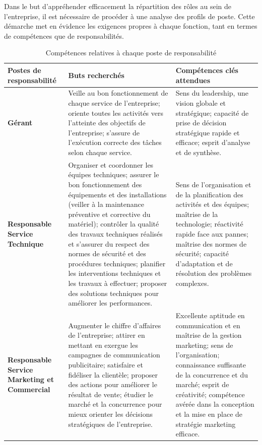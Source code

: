 Dans le but d'appréhender efficacement la répartition des rôles au sein de l'entreprise, il est nécessaire de procéder à une analyse des profils de poste. Cette démarche met en évidence les exigences propres à chaque fonction, tant en termes de compétences que de responsabilités.


\begin{table}[htbp]
    \centering
    \caption{Compétences relatives à chaque poste de responsabilité}
    \label{tab:competences}
    \renewcommand{\arraystretch}{1.5}
    \begin{tabularx}{\textwidth}{|>{\raggedright\arraybackslash}p{3cm}|X|X|}
        \hline
        \textbf{Postes de responsabilité} & \textbf{Buts recherchés} & \textbf{Compétences clés attendues} \\
        \hline
        \textbf{Gérant} & Veille au bon fonctionnement de chaque service de l'entreprise; oriente toutes les activités vers l'atteinte des objectifs de l'entreprise; s'assure de l'exécution correcte des tâches selon chaque service. & Sens du leadership, une vision globale et stratégique; capacité de prise de décision stratégique rapide et efficace; esprit d'analyse et de synthèse. \\
        \hline
        \textbf{Responsable Service Technique} & Organiser et coordonner les équipes techniques; assurer le bon fonctionnement des équipements et des installations (veiller à la maintenance préventive et corrective du matériel); contrôler la qualité des travaux techniques réalisés et s'assurer du respect des normes de sécurité et des procédures techniques; planifier les interventions techniques et les travaux à effectuer; proposer des solutions techniques pour améliorer les performances. & Sens de l'organisation et de la planification des activités et des équipes; maîtrise de la technologie; réactivité rapide face aux pannes; maîtrise des normes de sécurité; capacité d'adaptation et de résolution des problèmes complexes. \\
        \hline
        \textbf{Responsable Service Marketing et Commercial} & Augmenter le chiffre d'affaires de l'entreprise; attirer en mettant en exergue les campagnes de communication publicitaire; satisfaire et fidéliser la clientèle; proposer des actions pour améliorer le résultat de vente; étudier le marché et la concurrence pour mieux orienter les décisions stratégiques de l'entreprise. & Excellente aptitude en communication et en maîtrise de la gestion marketing; sens de l'organisation; connaissance suffisante de la concurrence et du marché; esprit de créativité; compétence avérée dans la conception et la mise en place de stratégie marketing efficace. \\

\end{tabularx}
\end{table}
